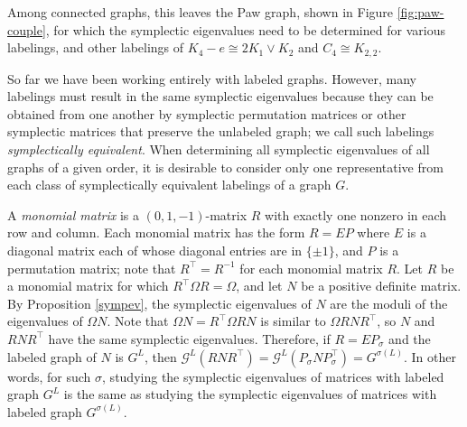 \documentclass[12pt]{article}
\theoremstyle{definition}
\theoremstyle{definition}
\theoremstyle{definition}
\numberwithin{figure}{section}
\numberwithin{equation}{section}
\newcommand{\G}{\mathcal{G}}
\newcommand{\trans}{^{\top}}
\begin{document}
Among connected graphs, this leaves  the Paw graph, shown in Figure \ref{fig:paw-couple}, for which the symplectic eigenvalues need to be determined for various labelings,  and  other labelings of   $K_4-e\cong 2K_1\vee K_2$ and $C_4\cong K_{2,2}$. 



So far we have been working entirely with labeled graphs. 
 However, many labelings must result in the same symplectic eigenvalues because they can be obtained from one another by symplectic permutation matrices or other symplectic matrices 
 that preserve the unlabeled graph; we call such labelings \emph{symplectically equivalent}.   When determining all symplectic eigenvalues of all graphs of a given order, it is desirable to consider only one representative from each class of symplectically equivalent labelings of a graph $G$.


A \textit{monomial matrix} is  a $(0,1,-1)$-matrix $R$ with exactly one nonzero in each row and column. 
Each monomial matrix has the form $R=EP$ where $E$ is a diagonal matrix each of whose diagonal entries are in $\{\pm 1\}$, 
and $P$ is a permutation matrix; note that $R\trans=R^{-1}$ for  each monomial matrix $R$. Let $R$ be a monomial matrix for which $R^{\top}{\Omega}R=\Omega$, and let $N$ be a positive definite matrix.
By Proposition \ref{sympev}, the  symplectic eigenvalues of $N$ 
are the moduli of the eigenvalues of $\Omega N$.
Note that $\Omega N= R^{\top} \Omega R N$ is similar to $\Omega R N R^{\top} $, so $N$ and $RNR^{\top}$ have the same symplectic eigenvalues. Therefore, if  $R=EP_\sigma$ and the labeled graph of $N$ is $G^L$, then $ \G^L(RNR^{\top})=\G^L(P_{\sigma} NP_{\sigma}^{\top})=G^{\sigma(L)}$. 
In other words, for such $\sigma$, 
studying the symplectic eigenvalues of matrices with labeled graph $G^{L}$ is  the same as studying the symplectic eigenvalues of matrices with labeled graph $G^{\sigma(L)}$. 
\end{document}
